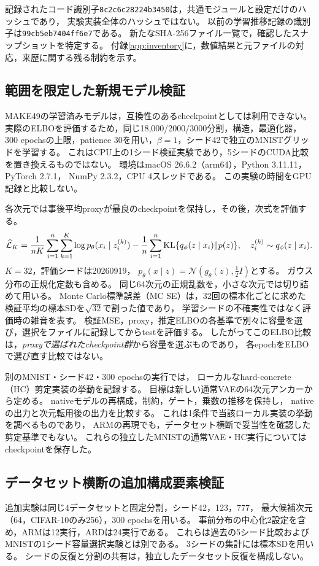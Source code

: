 \documentclass[11pt,a4paper]{ltjsarticle}
\begin{document}
記録されたコード識別子\texttt{8c2c6c28224b3450}は，共通モジュールと設定だけのハッシュであり，
実験実装全体のハッシュではない。
以前の学習推移記録の識別子は\texttt{99cb5eb7404ff6e7}である。
新たなSHA-256ファイル一覧で，確認したスナップショットを特定する。
付録\ref{app:inventory}に，数値結果と元ファイルの対応，来歴に関する残る制約を示す。

\subsection{範囲を限定した新規モデル検証}\label{sec:newvalidation}
MAKE49の学習済みモデルは，互換性のあるcheckpointとしては利用できない。
実際のELBOを評価するため，同じ18,000/2000/3000分割，構造，最適化器，
300 epochsの上限，patience 30を用い，$\beta=1$，シード42で独立のMNISTグリッドを学習する。
これはCPU上の1シード検証実験であり，5シードのCUDA比較を置き換えるものではない。
環境はmacOS 26.6.2（arm64），Python 3.11.11，PyTorch 2.7.1，
NumPy 2.3.2，CPU 4スレッドである。
この実験の時間をGPU記録と比較しない。

各次元では事後平均proxyが最良のcheckpointを保持し，その後，次式を評価する。
\begin{equation}
 \widehat{\mathcal L}_K
 =\frac{1}{nK}\sum_{i=1}^n\sum_{k=1}^K
 \log p_\theta(x_i\mid z_i^{(k)})
 -\frac1n\sum_{i=1}^n
 {\rm KL}\{q_\phi(z\mid x_i)\Vert p(z)\},\quad
 z_i^{(k)}\sim q_\phi(z\mid x_i).
 \label{eq:mc}
\end{equation}
$K=32$，評価シードは20260919，
$p_\theta(x\mid z)=\mathcal N(g_\theta(z),\tfrac12 I)$とする。
ガウス分布の正規化定数も含める。
同じ64次元の正規乱数を，小さな次元では切り詰めて用いる。
Monte Carlo標準誤差（MC SE）は，32回の標本化ごとに求めた検証平均の標本SDを$\sqrt{32}$で割った値であり，
学習シードの不確実性ではなく評価時の雑音を表す。
検証MSE，proxy，推定ELBOの各基準で別々に容量を選び，選択をファイルに記録してからtestを評価する。
したがってこのELBO比較は，\emph{proxyで選ばれたcheckpoint群}から容量を選ぶものであり，
各epochをELBOで選び直す比較ではない。

別のMNIST・シード42・300 epochsの実行では，
ローカルなhard-concrete（HC）剪定実装の挙動を記録する。
目標は新しい通常VAEの64次元アンカーから定める。
nativeモデルの再構成，制約，ゲート，乗数の推移を保持し，
nativeの出力と次元転用後の出力を比較する。
これは1条件で当該ローカル実装の挙動を調べるものであり，
ARMの再現でも，データセット横断で妥当性を確認した剪定基準でもない。
これらの独立したMNISTの通常VAE・HC実行についてはcheckpointを保存した。

\subsection{データセット横断の追加構成要素検証}\label{sec:gpuvalidation}
追加実験は同じ4データセットと固定分割，シード42，123，777，
最大候補次元（64，CIFAR-10のみ256），300 epochsを用いる。
事前分布の中心化2設定を含め，ARMは12実行，ARDは24実行である。
これらは過去の5シード比較およびMNISTの1シード容量選択実験とは別である。
3シードの集計には標本SDを用いる。
シードの反復と分割の共有は，独立したデータセット反復を構成しない。
\end{document}
